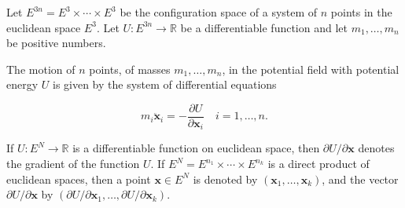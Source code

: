 Let $E^{3n} = E^3 \times \cdots \times E^3$ be the configuration space of a system of $n$ points in the euclidean space $E^3$. Let $U: E^{3n} \rightarrow \mathbb{R}$ be a differentiable function and let $m_1, \ldots, m_n$ be positive numbers.

The motion of $n$ points, of masses $m_1, \ldots, m_n$, in the potential field with potential energy $U$ is given by the system of differential equations

$$m_i \ddot{\mathbf{x}}_i = -\frac{\partial U}{\partial \mathbf{x}_i} \quad i = 1, \ldots, n.$$

If $U: E^N \rightarrow \mathbb{R}$ is a differentiable function on euclidean space, then $\partial U/\partial \mathbf{x}$ denotes the gradient of the function $U$. If $E^N = E^{n_1} \times \cdots \times E^{n_k}$ is a direct product of euclidean spaces, then a point $\mathbf{x} \in E^N$ is denoted by $(\mathbf{x}_1, \ldots, \mathbf{x}_k)$, and the vector $\partial U/\partial \mathbf{x}$ by $(\partial U/\partial \mathbf{x}_1, \ldots, \partial U/\partial \mathbf{x}_k)$.
